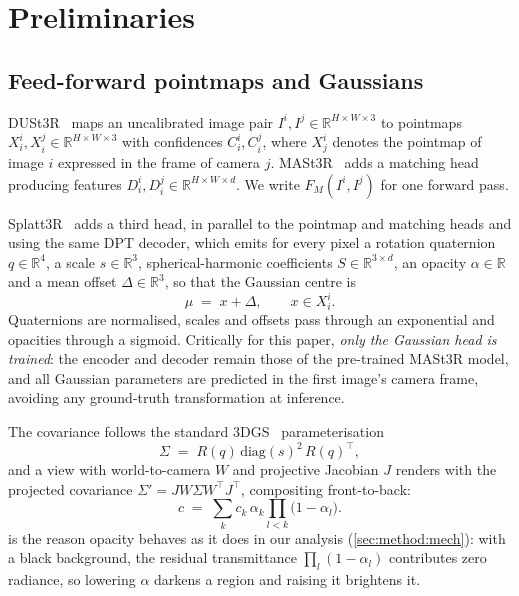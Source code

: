 \section{Preliminaries}
\label{sec:prelim}

\subsection{Feed-forward pointmaps and Gaussians}
DUSt3R~\cite{wang2024dust3r} maps an uncalibrated image pair
$I^i, I^j \in \mathbb{R}^{H\times W\times 3}$ to pointmaps
$X^i_i, X^j_i \in \mathbb{R}^{H\times W\times 3}$ with confidences
$C^i_i, C^j_i$, where $X^i_j$ denotes the pointmap of image $i$ expressed in
the frame of camera $j$. MASt3R~\cite{leroy2024mast3r} adds a matching head
producing features $D^i_i, D^j_i \in \mathbb{R}^{H\times W\times d}$. We write
$F_M(I^i, I^j)$ for one forward pass.

Splatt3R~\cite{smart2024splatt3r} adds a third head, in parallel to the
pointmap and matching heads and using the same DPT decoder, which emits for
every pixel a rotation quaternion $q\in\mathbb{R}^4$, a scale
$s\in\mathbb{R}^3$, spherical-harmonic coefficients
$S\in\mathbb{R}^{3\times d}$, an opacity $\alpha\in\mathbb{R}$ and a mean
offset $\Delta\in\mathbb{R}^3$, so that the Gaussian centre is
\begin{equation}
\mu \;=\; x + \Delta, \qquad x \in X^i_i .
\label{eq:mu}
\end{equation}
Quaternions are normalised, scales and offsets pass through an exponential and
opacities through a sigmoid. Critically for this paper, \emph{only the Gaussian
head is trained}: the encoder and decoder remain those of the pre-trained
MASt3R model, and all Gaussian parameters are predicted in the first image's
camera frame, avoiding any ground-truth transformation at inference.

The covariance follows the standard 3DGS~\cite{kerbl20233dgs} parameterisation
\begin{equation}
\Sigma \;=\; R(q)\,\mathrm{diag}(s)^2\,R(q)^\top ,
\label{eq:cov}
\end{equation}
and a view with world-to-camera $W$ and projective Jacobian $J$ renders with
the projected covariance $\Sigma' = J W \Sigma W^\top J^\top$, compositing
front-to-back:
\begin{equation}
c \;=\; \sum_{k} c_k\,\alpha_k \prod_{l<k}\bigl(1-\alpha_l\bigr).
\label{eq:alphacomp}
\end{equation}
 is the reason opacity behaves as it does in our analysis
(\cref{sec:method:mech}): with a black background, the residual transmittance
$\prod_l (1-\alpha_l)$ contributes zero radiance, so lowering $\alpha$ darkens
a region and raising it brightens it.

